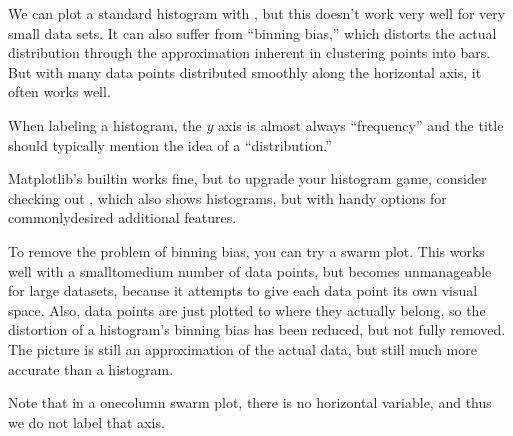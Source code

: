 \documentclass[letterpaper,10pt,english]{sphinxmanual}
\begin{document}
We can plot a standard histogram with , but this doesn’t work very well for very small data sets.  It can also suffer from “binning bias,” which distorts the actual distribution through the approximation inherent in clustering points into bars.  But with many data points distributed smoothly along the horizontal axis, it often works well.

When labeling a histogram, the \(y\) axis is almost always “frequency” and the title should typically mention the idea of a “distribution.”

\begin{sphinxVerbatim}[commandchars=\\\{\}]
 \PYG{p}{[}\PYG{p}{]} 
  
  
  
\end{sphinxVerbatim}

\noindent{}

Matplotlib’s built\sphinxhyphen{}in  works fine, but to upgrade your histogram game, consider checking out , which also shows histograms, but with handy options for commonly\sphinxhyphen{}desired additional features.

To remove the problem of binning bias, you can try a swarm plot.  This works well with a small\sphinxhyphen{}to\sphinxhyphen{}medium number of data points, but becomes unmanageable for large datasets, because it attempts to give each data point its own visual space.  Also, data points are just plotted  to where they actually belong, so the distortion of a histogram’s binning bias has been reduced, but not fully removed.  The picture is still an approximation of the actual data, but still much more accurate than a histogram.

Note that in a one\sphinxhyphen{}column swarm plot, there is no horizontal variable, and thus we do not label that axis.
\end{document}
